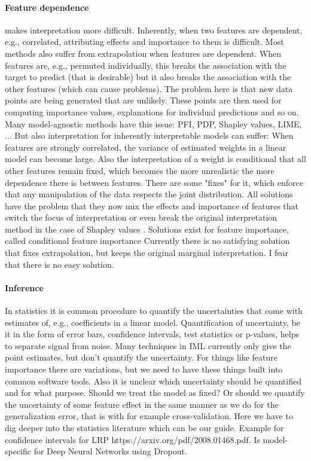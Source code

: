 \documentclass[runningheads]{llncs}
\begin{document}
\paragraph{Feature dependence} makes interpretation more difficult.
Inherently, when two features are dependent, e.g., correlated, attributing effects and importance to them is difficult.
Most methods also suffer from extrapolation when features are dependent.
When features are, e.g., permuted individually, this breaks the association with the target to predict (that is desirable) but it also breaks the association with the other features (which can cause problems).
The problem here is that new data points are being generated that are unlikely.
These points are then used for computing importance values, explanations for individual predictions and so on.
Many model-agnostic methods have this issue: PFI, PDP, Shapley values, LIME, ...
But also interpretation for inherently interpretable models can suffer:
When features are strongly correlated, the variance of estimated weights in a linear model can become large.
Also the interpretation of a weight is conditional that all other features remain fixed, which becomes the more unrealistic the more dependence there is between features.
There are some "fixes" for it, which enforce that any manipulation of the data respects the joint distribution.
All solutions have the problem that they now mix the effects and importance of features that switch the focus of interpretation or even break the original interpretation method in the case of Shapley values \cite{sundararajan2019many,janzing2019feature}.
Solutions exist for feature importance, called conditional feature importance \cite{watson2019testing,candes2018panning,strobl2008conditional,molnar2020model}
Currently there is no satisfying solution that fixes extrapolation, but keeps the original marginal interpretation.
I fear that there is no easy solution.

\paragraph{Inference}
In statistics it is common procedure to quantify the uncertainties that come with estimates of, e.g., coefficients in a linear model.
Quantification of uncertainty, be it in the form of error bars, confidence intervals, test statistics or p-values, helps to separate signal from noise.
Many techniques in IML currently only give the point estimates, but don't quantify the uncertainty.
For things like feature importance there are variations, but we need to have these things built into common software tools.
Also it is unclear which uncertainty should be quantified and for what purpose.
Should we treat the model as fixed?
Or should we quantify the uncertainty of some feature effect in the same manner as we do for the generalization error, that is with for example cross-validation.
Here we have to dig deeper into the statistics literature which can be our guide.
Example for confidence intervals for LRP https://arxiv.org/pdf/2008.01468.pdf.
Is model-specific for Deep Neural Networks using Dropout.
\end{document}
